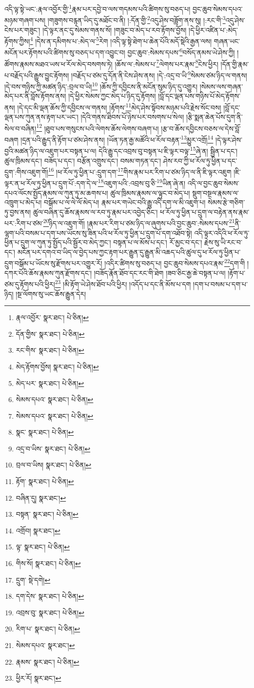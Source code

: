འདི་ལྟ་སྟེ་ཡང་:རྣལ་འབྱོར་གྱི་\footnote{རྣལ་འབྱོར་  སྣར་ཐང་།  པེ་ཅིན། }རྣམ་པར་དབྱེ་བ་ལས་གདམས་པའི་ཚིགས་སུ་བཅད་པ། བྱང་ཆུབ་སེམས་དཔའ་མཉམ་གཞག་པས། །གཟུགས་བརྙན་ཡིད་དུ་མཐོང་བ་ནི། །:དོན་གྱི་\footnote{དོན་གྱིས་  སྣར་ཐང་།  པེ་ཅིན། }འདུ་ཤེས་བཟློག་ནས་སུ། །:རང་གི་\footnote{རང་གིས་  སྣར་ཐང་།  པེ་ཅིན། }འདུ་ཤེས་ངེས་པར་གཟུང་། །དེ་ལྟར་ནང་དུ་སེམས་གནས་སོ། །གཟུང་བ་མེད་པ་རབ་རྟོགས་བྱོས། །དེ་ཕྱིར་འཛིན་པ་:མེད་རྟོགས་ཀྱིས།\footnote{མེད་རྟོགས་བྱོས།  སྣར་ཐང་།  པེ་ཅིན། } །དེས་ན་དམིགས་པ་:མེད་ལ་\footnote{མེད་པར་  སྣར་ཐང་།  པེ་ཅིན། }རེག །འདི་ལྟ་སྟེ་ཐེག་པ་ཆེན་པོའི་མདོ་སྡེའི་རྒྱན་ལས། གཞན་ཡང་མངོན་པར་རྟོགས་པའི་ཚིགས་སུ་བཅད་པ་དག་འབྱུང་བ། བྱང་ཆུབ་:སེམས་དཔས་\footnote{སེམས་དཔའ་  སྣར་ཐང་།  པེ་ཅིན། }བསོད་ནམས་ཡེ་ཤེས་ཀྱི། །ཚོགས་རྣམས་མཐའ་ཡས་ཕ་རོལ་མེད་བསགས་ཏེ། །ཆོས་ལ་:སེམས་པ་\footnote{སེམས་དཔའ་  སྣར་ཐང་།  པེ་ཅིན། }ལེགས་པར་རྣམ་\footnote{སྣང་  སྣར་ཐང་།  པེ་ཅིན། }ངེས་ཕྱིར། །དོན་གྱི་རྣམ་པ་བརྗོད་པའི་རྒྱུས་བྱུང་རྟོགས། །བརྗོད་པ་ཙམ་དུ་དོན་ནི་ངེས་ཤེས་ནས། །དེ་:འདྲ་བ་ཡི་\footnote{འདྲ་བ་ཡིས་  སྣར་ཐང་།  པེ་ཅིན། }སེམས་ཙམ་ཉིད་ལ་གནས། །དེ་བས་གཉིས་ཀྱི་མཚན་ཉིད་:བྲལ་བ་ཡི།\footnote{བྲལ་བ་ཡིས།  སྣར་ཐང་།  པེ་ཅིན། } །ཆོས་ཀྱི་དབྱིངས་ནི་མངོན་སུམ་ཉིད་དུ་འགྱུར། །སེམས་ལས་གཞན་མེད་པར་ནི་བློས་རྟོགས་ནས། །དེ་ཕྱིར་སེམས་ཀྱང་མེད་པ་ཉིད་དུ་རྟོགས། །བློ་དང་ལྡན་པས་གཉིས་པོ་མེད་རྟོགས་ནས། །དེ་དང་མི་ལྡན་ཆོས་ཀྱི་དབྱིངས་ལ་གནས། །རྟོགས་\footnote{རྟོག་  སྣར་ཐང་།  པེ་ཅིན། }མེད་ཤེས་སྟོབས་མཉམ་པའི་རྗེས་སོང་བས། །བློ་དང་ལྡན་པས་ཀུན་ནས་རྟག་པར་ཡང་། །དེའི་གནས་ཐིབས་པོ་ཉེས་པར་བསགས་པ་སེལ། །རྩི་སྨན་ཆེན་པོས་དུག་ནི་སེལ་བ་བཞིན།\footnote{བཞིན་དུ།  སྣར་ཐང་། } །ཐུབ་པས་གསུངས་པའི་ལེགས་ཆོས་ལེགས་བཞག་པ། །རྩ་བ་ཆོས་དབྱིངས་བཅས་ལ་དེས་བློ་བཞག །དྲན་པའི་རྒྱུད་ནི་རྟོག་པ་ཙམ་ཤེས་ནས། །ཡོན་ཏན་རྒྱ་མཚོའི་ཕ་རོལ་བརྟན་\footnote{བསྟན་  སྣར་ཐང་།  པེ་ཅིན། }མྱུར་འགྲོ།\footnote{འགྲོབ།  སྣར་ཐང་། } །དེ་ལྟར་ཤེས་བྱའི་མཚན་ཉིད་ལ་འཇུག་པར་བསྟན་པ་ལ། དེའི་རྒྱུ་དང་འབྲས་བུ་བསྟན་པ་ཇི་ལྟར་བལྟ་\footnote{ལྟ་  སྣར་ཐང་།  པེ་ཅིན། }ཞེ་ན། སྦྱིན་པ་དང་། ཚུལ་ཁྲིམས་དང་། བཟོད་པ་དང་། བརྩོན་འགྲུས་དང་། བསམ་གཏན་དང་། ཤེས་རབ་ཀྱི་ཕ་རོལ་ཏུ་ཕྱིན་པ་དང་དྲུག་:གིས་འཇུག་གོ།\footnote{གིས་སོ།  སྣར་ཐང་།  པེ་ཅིན། } །ཕ་རོལ་ཏུ་ཕྱིན་པ་:དྲུག་དག་\footnote{དྲུག་  སྡེ་དགེ། }གིས་རྣམ་པར་རིག་པ་ཙམ་ཉིད་ལ་ནི་ཇི་ལྟར་འཇུག །ཇི་ལྟར་ན་ཕ་རོལ་ཏུ་ཕྱིན་པ་དྲུག་པོ་:དག་དེ་ལ་\footnote{དག་དེས་  སྣར་ཐང་།  པེ་ཅིན། }འཇུག་པའི་:འབྲས་བུ་ཅི་\footnote{འབྲས་བུ་  སྣར་ཐང་།  པེ་ཅིན། }ཡིན་ཞེ་ན། འདི་ལ་བྱང་ཆུབ་སེམས་དཔའ་ལོངས་སྤྱོད་རྣམས་ལ་ཀུན་ཏུ་མ་ཆགས་པ། ཚུལ་ཁྲིམས་རྣམས་ལ་ལྟུང་བ་མེད་པ། སྡུག་བསྔལ་རྣམས་ལ་འཁྲུག་པ་མེད་པ། བསྒོམ་པ་ལ་ལེ་ལོ་མེད་པ། རྣམ་པར་གཡེང་བའི་རྒྱུ་འདི་དག་ལ་མི་འཇུག་པ། སེམས་རྩེ་གཅིག་ཏུ་བྱས་ནས། ཚུལ་བཞིན་དུ་ཆོས་རྣམས་ལ་རབ་ཏུ་རྣམ་པར་འབྱེད་ཅིང་། ཕ་རོལ་ཏུ་ཕྱིན་པ་དྲུག་ལ་བརྟེན་ནས་རྣམ་པར་:རིག་པ་ཙམ་\footnote{རིག་པ་  སྣར་ཐང་།  པེ་ཅིན། }ཉིད་ལ་འཇུག་གོ། །རྣམ་པར་རིག་པ་ཙམ་ཉིད་ལ་ཞུགས་པའི་བྱང་ཆུབ་:སེམས་དཔས་\footnote{སེམས་དཔའ་  སྣར་ཐང་། }ནི་ལྷག་པའི་བསམ་པ་དག་པས་ཡོངས་སུ་ཟིན་པའི་ཕ་རོལ་ཏུ་ཕྱིན་པ་དྲུག་པོ་དག་འཐོབ་སྟེ། འདི་ལྟར་འདིའི་ཕ་རོལ་ཏུ་ཕྱིན་པ་དྲུག་ལ་ཀུན་ཏུ་སྤྱོད་པའི་སྦྱོར་བ་མེད་ཀྱང་། བསྟན་པ་ལ་མོས་པ་དང་། རོ་མྱང་བ་དང་། རྗེས་སུ་ཡི་རང་བ་དང་། མངོན་པར་དགའ་བ་ཡིད་ལ་བྱེད་པས་ཀྱང་རྟག་པར་རྒྱུན་དུ་རྒྱུན་མི་འཆད་པའི་ཚུལ་དུ་ཕ་རོལ་ཏུ་ཕྱིན་པ་དྲུག་བསྒོམ་པ་ཡོངས་སུ་རྫོགས་པར་འགྱུར་རོ། །འདིར་ཚིགས་སུ་བཅད་པ། བྱང་ཆུབ་སེམས་དཔའ་རྣམ་\footnote{རྣམས་  སྣར་ཐང་།  པེ་ཅིན། }དག་གི །དཀར་པོའི་ཆོས་རྣམས་ཀུན་རྫོགས་དང་། །བཟོད་རྣོན་ཐོབ་དང་རང་གི་ཐེག །ཟབ་ཅིང་རྒྱ་ཆེ་བསྟན་པ་ལ། །རྟོག་པ་ཙམ་དུ་རྟོགས་པའི་ཕྱིར།\footnote{ཕྱིར་རོ།  སྣར་ཐང་། } །མི་རྟོག་ཡེ་ཤེས་ཐོབ་པའི་ཕྱིར། །འདོད་པ་དང་ནི་མོས་པ་དག །དག་པ་བསམ་པ་དག་པ་ཉིད། །སྔ་ལོགས་སུ་ཡང་ཆོས་རྒྱུན་དེར། 